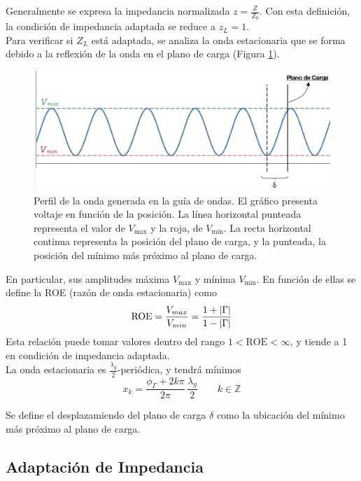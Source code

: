 \documentclass[11pt,a4paper]{article}
\DeclarePairedDelimiter\abs{\lvert}{\rvert}%
\begin{document}
\begin{multicols}{2}
Generalmente se expresa la impedancia normalizada $z=\frac{Z}{Z_0}$. Con esta definición, la condición de impedancia adaptada se reduce a $z_L=1$.\\


Para verificar si $Z_L$ está adaptada, se analiza la onda estacionaria que se forma debido a la reflexión de la onda en el plano de carga (Figura \ref{fig:onda}). 
\begin{figure}[H]
    \centering
    \includegraphics[width=0.9\linewidth]{Images/onda vmax.jpg}
    \caption{Perfil de la onda generada en la guía de ondas. El gráfico presenta voltaje en función de la posición. La línea horizontal punteada representa el valor de $V_\text{max}$ y la roja, de $V_\text{min}$. La recta horizontal continua representa la posición del plano de carga, y la punteada, la posición del mínimo más próximo al plano de carga.}
    \label{fig:onda}
\end{figure}
En particular, sus amplitudes máxima $V_\text{max}$ y mínima $V_\text{min}$. 
En función de ellas se define la ROE (razón de onda estacionaria) como
\begin{equation}\label{eq:roe}
    \text{ROE} = \frac{V_{max}}{V_{min}} = \frac{1+\abs{\Gamma}}{1-\abs{\Gamma}}
\end{equation}
Esta relación puede tomar valores dentro del rango $1<\text{ROE} < \infty$, y tiende a 1 en condición de impedancia adaptada. \\

La onda estacionaria es $\frac{\lambda_g}{2}$-periódica, y tendrá mínimos 
\begin{equation}
    x_k = \frac{\phi_\Gamma + 2 k\pi}{2\pi} \, \frac{\lambda_g}{2} \qquad  k\in\mathbb{Z}
\end{equation}

Se define el desplazamiendo del plano de carga $\delta$ como la ubicación del mínimo más próximo al plano de carga.\\

\subsection{Adaptación de Impedancia}


\end{multicols}
\end{document}
